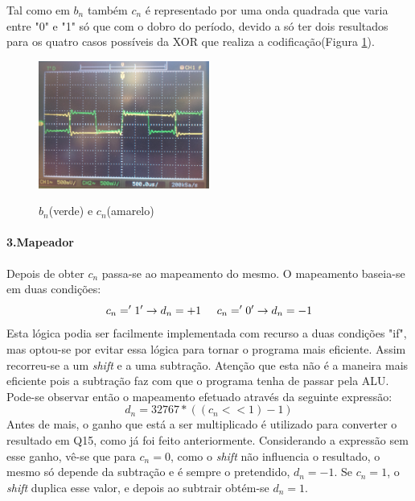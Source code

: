 \documentclass[11pt]{article}
\numberwithin{equation}{section}
\begin{document}
Tal como em $ b_n $ também $ c_n $ é representado por uma onda quadrada que varia entre "0" e "1" só que com o dobro do período, devido a só ter dois resultados para os quatro casos possíveis da XOR que realiza a codificação(Figura \ref{bn_cn}).
\begin{figure}[H]
	\centering
	\includegraphics[width=0.5\textwidth]{./bn_cn}~\\
	\caption{$ b_n $(verde) e $ c_n $(amarelo)}
	\label{bn_cn}
\end{figure}

\paragraph{3.Mapeador} \hspace{0pt}

Depois de obter $ c_n $ passa-se ao mapeamento do mesmo. O mapeamento baseia-se em duas condições:
\begin{equation}
	c_n= '1' \rightarrow d_n =+1 \hspace{5 mm} c_n='0' \rightarrow d_n=-1
\end{equation}
Esta lógica podia ser facilmente implementada com recurso a duas condições "if", mas optou-se por evitar essa lógica para tornar o programa mais eficiente.
Assim recorreu-se a um \textit{shift} e a uma subtração. Atenção que esta não é a maneira mais eficiente pois a subtração faz com que o programa tenha de passar pela ALU.
Pode-se observar então o mapeamento efetuado através da seguinte expressão:
\begin{equation}
d_n=32767*((c_n << 1)-1)
\end{equation}
Antes de mais, o ganho que está a ser multiplicado é utilizado para converter o resultado em Q15, como já foi feito anteriormente. Considerando a expressão sem esse ganho, vê-se que para $ c_n=0 $, como o \textit{shift} não influencia o resultado, o mesmo só depende da subtração e é sempre o pretendido, $d_n=-1$. Se $c_n=1$, o \textit{shift} duplica  esse valor, e depois ao subtrair obtém-se $d_n=1$.
\end{document}
